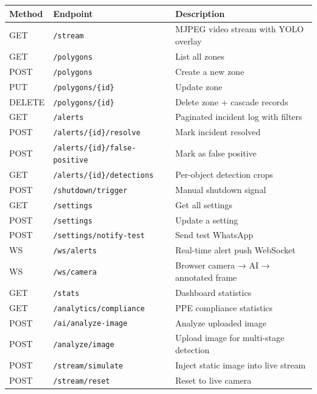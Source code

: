 \documentclass[12pt,a4paper,oneside]{book}
\begin{document}
\begin{longtable}{|l|l|p{8cm}|}
    \hline
    \textbf{Method} & \textbf{Endpoint} & \textbf{Description} \\
    \hline
    GET & \texttt{/stream} & MJPEG video stream with YOLO overlay \\
    \hline
    GET & \texttt{/polygons} & List all zones \\
    \hline
    POST & \texttt{/polygons} & Create a new zone \\
    \hline
    PUT & \texttt{/polygons/\{id\}} & Update zone \\
    \hline
    DELETE & \texttt{/polygons/\{id\}} & Delete zone + cascade records \\
    \hline
    GET & \texttt{/alerts} & Paginated incident log with filters \\
    \hline
    POST & \texttt{/alerts/\{id\}/resolve} & Mark incident resolved \\
    \hline
    POST & \texttt{/alerts/\{id\}/false-positive} & Mark as false positive \\
    \hline
    GET & \texttt{/alerts/\{id\}/detections} & Per-object detection crops \\
    \hline
    POST & \texttt{/shutdown/trigger} & Manual shutdown signal \\
    \hline
    GET & \texttt{/settings} & Get all settings \\
    \hline
    POST & \texttt{/settings} & Update a setting \\
    \hline
    POST & \texttt{/settings/notify-test} & Send test WhatsApp \\
    \hline
    WS & \texttt{/ws/alerts} & Real-time alert push WebSocket \\
    \hline
    WS & \texttt{/ws/camera} & Browser camera → AI → annotated frame \\
    \hline
    GET & \texttt{/stats} & Dashboard statistics \\
    \hline
    GET & \texttt{/analytics/compliance} & PPE compliance statistics \\
    \hline
    POST & \texttt{/ai/analyze-image} & Analyze uploaded image \\
    \hline
    POST & \texttt{/analyze/image} & Upload image for multi-stage detection \\
    \hline
    POST & \texttt{/stream/simulate} & Inject static image into live stream \\
    \hline
    POST & \texttt{/stream/reset} & Reset to live camera \\

\end{longtable}
\end{document}
